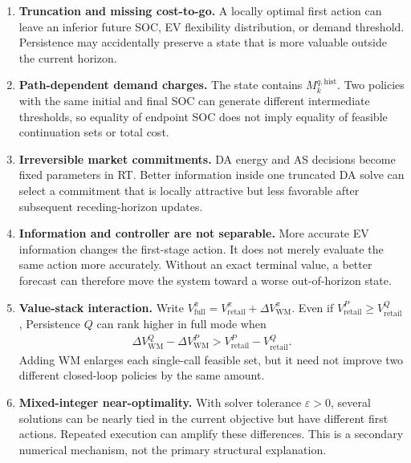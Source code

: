 \documentclass[final,5p,times]{elsarticle}
\begin{document}
\begin{enumerate}[leftmargin=*]
\item \textbf{Truncation and missing cost-to-go.} A locally optimal first action can leave an inferior future SOC, EV flexibility distribution, or demand threshold. Persistence may accidentally preserve a state that is more valuable outside the current horizon.

\item \textbf{Path-dependent demand charges.} The state contains $M_k^{q,\mathrm{hist}}$. Two policies with the same initial and final SOC can generate different intermediate thresholds, so equality of endpoint SOC does not imply equality of feasible continuation sets or total cost.

\item \textbf{Irreversible market commitments.} DA energy and AS decisions become fixed parameters in RT. Better information inside one truncated DA solve can select a commitment that is locally attractive but less favorable after subsequent receding-horizon updates.

\item \textbf{Information and controller are not separable.} More accurate EV information changes the first-stage action. It does not merely evaluate the same action more accurately. Without an exact terminal value, a better forecast can therefore move the system toward a worse out-of-horizon state.

\item \textbf{Value-stack interaction.} Write $V^{\pi}_{\mathrm{full}}=V^{\pi}_{\mathrm{retail}}+\Delta V^{\pi}_{\mathrm{WM}}$. Even if $V^{P}_{\mathrm{retail}}\ge V^{Q}_{\mathrm{retail}}$, Persistence $Q$ can rank higher in full mode when
\begin{align}
\Delta V^{Q}_{\mathrm{WM}}-\Delta V^{P}_{\mathrm{WM}}
>V^{P}_{\mathrm{retail}}-V^{Q}_{\mathrm{retail}}.
\label{eq:ranking_reversal}
\end{align}
Adding WM enlarges each single-call feasible set, but it need not improve two different closed-loop policies by the same amount.

\item \textbf{Mixed-integer near-optimality.} With solver tolerance $\varepsilon>0$, several solutions can be nearly tied in the current objective but have different first actions. Repeated execution can amplify these differences. This is a secondary numerical mechanism, not the primary structural explanation.
\end{enumerate}
\end{document}
